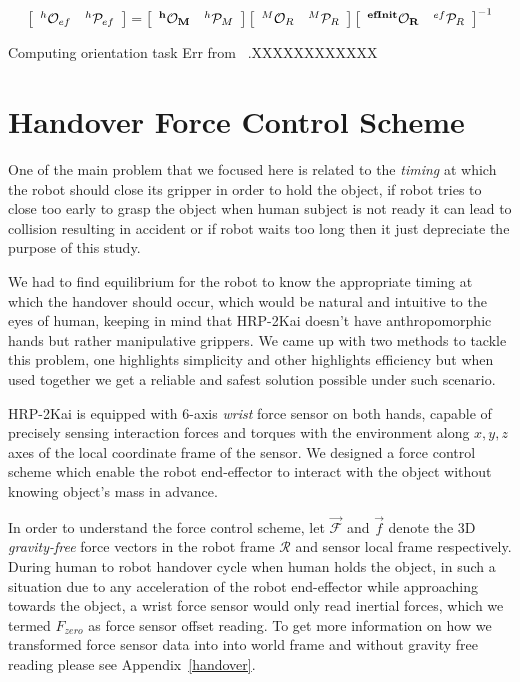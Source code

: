 \documentclass[a4paper, 12pt, oneside]{Thesis}  %
\begin{document}
\begin{gather}\label{X_efinit_hori}
\left[\begin{array}{cc}
{}^{h}\mathcal{O}_{ef} & {}^{h}\mathcal{P}_{ef}
\end{array}\right] =
\left[\begin{array}{cc}
\bf{{}^{h}\mathcal{O}_M} & {}^{h}\mathcal{P}_M
\end{array}\right]
\left[\begin{array}{cc}
{}^{M}\mathcal{O}_R & {}^{M}\mathcal{P}_R
\end{array}\right]
\left[\begin{array}{cc}
\bf{{}^{efInit}\mathcal{O}_{R}} & {}^{ef}\mathcal{P}_{R}
\end{array}\right]^{-1}
\end{gather}

Computing orientation task Err from~\cite{ladder-HRP-2Kai} .XXXXXXXXXXXX


\clearpage
\section{Handover Force Control Scheme}

One of the main problem that we focused here is related to the \textit{timing} at which the robot should close its gripper in order to hold the object, if robot tries to close too early to grasp the object when human subject is not ready it can lead to collision resulting in accident or if robot waits too long then it just depreciate the purpose of this study.

We had to find equilibrium for the robot to know the appropriate timing at which the handover should occur, which would be natural and intuitive to the eyes of human, keeping in mind that HRP-2Kai doesn't have anthropomorphic hands but rather manipulative grippers. We came up with two methods to tackle this problem, one highlights simplicity and other highlights efficiency but when used together we get a reliable and safest solution possible under such scenario.

HRP-2Kai is equipped with 6-axis \textit{wrist} force sensor on both hands, capable of precisely sensing interaction forces and torques with the environment along $x, y, z$ axes of the local coordinate frame of the sensor. We designed a force control scheme which enable the robot end-effector to interact with the object without knowing object's mass in advance.

In order to understand the force control scheme, let $\mathcal{\vec{F}}$ and $\vec{f}$ denote the 3D \textit{gravity-free} force vectors in the robot frame $\mathcal{R}$ and sensor local frame respectively. During human to robot handover cycle when human holds the object, in such a situation due to any acceleration of the robot end-effector while approaching towards the object, a wrist force sensor would only read inertial forces, which we termed $F_{zero}$ as force sensor offset reading. To get more information on how we transformed force sensor data into into world frame and without gravity free reading please see Appendix~\ref{handover}.
\end{document}
